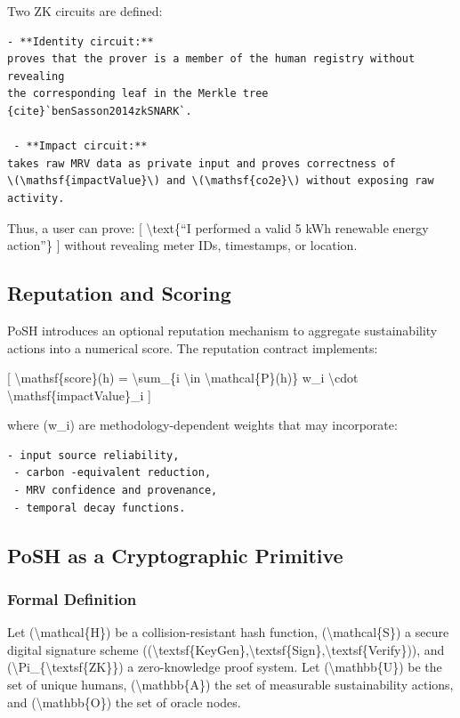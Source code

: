 \documentclass{article}
\begin{document}
Two ZK circuits are defined:

\begin{verbatim}
- **Identity circuit:**
proves that the prover is a member of the human registry without revealing
the corresponding leaf in the Merkle tree {cite}`benSasson2014zkSNARK`.

 - **Impact circuit:**
takes raw MRV data as private input and proves correctness of
\(\mathsf{impactValue}\) and \(\mathsf{co2e}\) without exposing raw activity.
\end{verbatim}

Thus, a user can prove:
[
{\textbackslash}text\{``I performed a valid 5 kWh renewable energy action''\}
]
without revealing meter IDs, timestamps, or location.

\subsection{Reputation and Scoring}

PoSH introduces an optional reputation mechanism to aggregate sustainability
actions into a numerical score. The reputation contract implements:

[
{\textbackslash}mathsf\{score\}(h) = {\textbackslash}sum\_\{i {\textbackslash}in {\textbackslash}mathcal\{P\}(h)\} w\_i {\textbackslash}cdot {\textbackslash}mathsf\{impactValue\}\_i
]

where (w\_i) are methodology-dependent weights that may incorporate:

\begin{verbatim}
- input source reliability,
 - carbon -equivalent reduction,
 - MRV confidence and provenance,
 - temporal decay functions.
\end{verbatim}

\subsection{PoSH as a Cryptographic Primitive}

\subsubsection{Formal Definition}

Let ({\textbackslash}mathcal\{H\}) be a collision-resistant hash function, ({\textbackslash}mathcal\{S\}) a
secure digital signature scheme (({\textbackslash}textsf\{KeyGen\},{\textbackslash}textsf\{Sign\},{\textbackslash}textsf\{Verify\})),
and ({\textbackslash}Pi\_\{{\textbackslash}textsf\{ZK\}\}) a zero-knowledge proof system. Let ({\textbackslash}mathbb\{U\}) be
the set of unique humans, ({\textbackslash}mathbb\{A\}) the set of measurable sustainability
actions, and ({\textbackslash}mathbb\{O\}) the set of oracle nodes.
\end{document}
